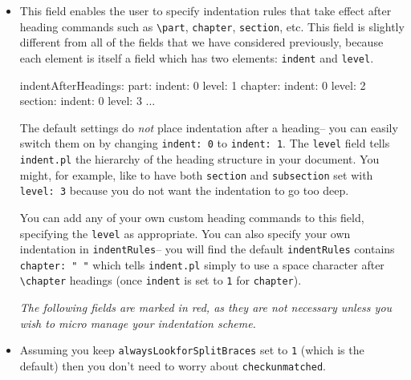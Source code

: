 \begin{itemize}
 		\item[\verbitem{indentAfterHeadings}] This field enables the user to specify 
 		indentation rules that take effect after heading commands such as \lstinline!\part!, \lstinline!chapter!, 
 		\lstinline!section!, etc. This field is slightly different from all 
 		of the fields that we have considered previously, because each element is 
 		itself a field which has two elements: \lstinline!indent! and \lstinline!level!.
 		\begin{yaml}[caption={\lstinline!indentAfterHeadings!},label={lst:indentAfterHeadings}]
indentAfterHeadings:
    part:
       indent: 0
       level: 1
    chapter: 
       indent: 0
       level: 2
    section:
       indent: 0
       level: 3
    ...
 		\end{yaml}
 		The default settings do \emph{not} place indentation after a heading-- you 
 		can easily switch them on by changing \lstinline!indent: 0! to \lstinline!indent: 1!.
 		The \lstinline!level! field tells \lstinline!indent.pl! the hierarchy of the heading 
 		structure in your document. You might, for example, like to have both \lstinline!section!
 		and \lstinline!subsection! set with \lstinline!level: 3! because you do not want the indentation to go too deep. 

 		You can add any of your own custom heading commands to this field, specifying the \lstinline!level!
 		as appropriate.  You can also specify your own indentation in \lstinline!indentRules!-- 
 		you will find the default \lstinline!indentRules! contains \lstinline!chapter: " "! which 
 		tells \lstinline!indent.pl! simply to use a space character after \lstinline!\chapter! headings 
 		(once \lstinline!indent! is set to \lstinline!1! for \lstinline!chapter!).
 		\begin{warning}
 			\emph{The following fields are marked in red, as they are not necessary
 			unless you wish to micro manage your indentation scheme.}
 		\end{warning}
 		 					
 		\item[\color{red}\verbitem{checkunmatched}] Assuming you keep \lstinline!alwaysLookforSplitBraces! set to \lstinline!1! (which
 		is the default) then you don't need to worry about \lstinline!checkunmatched!. 
 		 					

\end{itemize}
